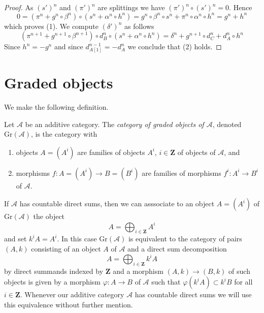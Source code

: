 \begin{proof}
As $(s')^n$ and $(\pi')^n$ are splittings we have $(\pi')^n \circ (s')^n = 0$.
Hence
$$
0 = ( \pi^n + g^n \circ \beta^n ) \circ ( s^n + \alpha^n \circ h^n ) =
g^n \circ \beta^n \circ s^n + \pi^n \circ \alpha^n \circ h^n =
g^n + h^n
$$
which proves (1). We compute $(\delta')^n$ as follows
$$
( \pi^{n + 1} + g^{n + 1} \circ \beta^{n + 1} )
\circ d_B^n \circ
( s^n + \alpha^n \circ h^n )
= \delta^n + g^{n + 1} \circ d_C^n + d_A^n \circ h^n
$$
Since $h^n = -g^n$ and since $d_{A[1]}^{n - 1} = -d_A^n$ we conclude that (2)
holds.
\end{proof}




\section{Graded objects}
\label{section-graded}

\noindent
We make the following definition.

\begin{definition}
\label{definition-graded}
Let $\mathcal{A}$ be an additive category. The {\it category of graded
objects of $\mathcal{A}$}, denoted $\text{Gr}(\mathcal{A})$, is
the category with
\begin{enumerate}
\item objects $A = (A^i)$ are families of objects $A^i$, $i \in \mathbf{Z}$
of objects of $\mathcal{A}$, and
\item morphisms $f : A = (A^i) \to B = (B^i)$ are families of
morphisms $f^i : A^i \to B^i$ of $\mathcal{A}$.
\end{enumerate}
\end{definition}

\noindent
If $\mathcal{A}$ has countable direct sums, then we can asssociate to
an object $A = (A^i)$ of $\text{Gr}(\mathcal{A})$ the object
$$
A = \bigoplus\nolimits_{i \in \mathbf{Z}} A^i
$$
and set $k^iA = A^i$. In this case $\text{Gr}(\mathcal{A})$ is equivalent
to the category of pairs $(A, k)$ consisting of an object $A$ of
$\mathcal{A}$ and a direct sum decomposition
$$
A = \bigoplus\nolimits_{i \in \mathbf{Z}} k^iA
$$
by direct summands indexed by $\mathbf{Z}$ and a morphism $(A, k) \to (B, k)$
of such objects is given by a morphism $\varphi : A \to B$ of $\mathcal{A}$
such that $\varphi(k^iA) \subset k^iB$ for all $i \in \mathbf{Z}$. Whenever
our additive category $\mathcal{A}$ has countable direct sums we will
use this equivalence without further mention.

